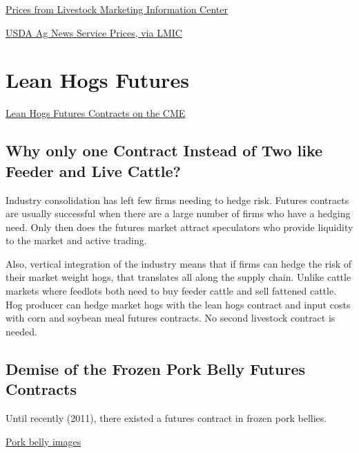 \documentclass[
]{book}
\begin{document}
\href{http://www.lmic.info/spreadsheet/prices-and-production}{Prices from Livestock Marketing Information Center}

\href{http://www.lmic.info/quick_market_reports/hogs}{USDA Ag News Service Prices, via LMIC}

\hypertarget{lean-hogs-futures}{%
\section{Lean Hogs Futures}\label{lean-hogs-futures}}

\href{http://www.cmegroup.com/trading/agricultural/livestock/lean-hogs.html}{Lean Hogs Futures Contracts on the CME}

\hypertarget{why-only-one-contract-instead-of-two-like-feeder-and-live-cattle}{%
\subsection{Why only one Contract Instead of Two like Feeder and Live Cattle?}\label{why-only-one-contract-instead-of-two-like-feeder-and-live-cattle}}

Industry consolidation has left few firms needing to hedge risk. Futures contracts are usually successful when there are a large number of firms who have a hedging need. Only then does the futures market attract speculators who provide liquidity to the market and active trading.

Also, vertical integration of the industry means that if firms can hedge the risk of their market weight hogs, that translates all along the supply chain. Unlike cattle markets where feedlots both need to buy feeder cattle and sell fattened cattle. Hog producer can hedge market hogs with the lean hogs contract and input costs with corn and soybean meal futures contracts. No second livestock contract is needed.

\hypertarget{demise-of-the-frozen-pork-belly-futures-contracts}{%
\subsection{Demise of the Frozen Pork Belly Futures Contracts}\label{demise-of-the-frozen-pork-belly-futures-contracts}}

Until recently (2011), there existed a futures contract in frozen pork bellies.

\href{https://www.google.com/search?q=pork+belly\&biw=1920\&bih=1075\&noj=1\&source=lnms\&tbm=isch\&sa=X\&ved=0CAgQ_AUoAmoVChMIhbO55IqdyQIVDNUeCh0_owNp}{Pork belly images}
\end{document}
